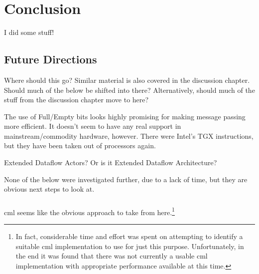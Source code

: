 \chapter{Conclusion}

I did some stuff!

\section{Future Directions}

\begin{anfxwarning}{Where should this go?}
    Similar material is also covered in the discussion chapter.  Should much of the below be shifted into there?  Alternatively, should much of the stuff from the discussion chapter move to here?
\end{anfxwarning}

The use of Full/Empty bits looks highly promising for making message passing more efficient.  It doesn't seem to have any real support in mainstream/commodity hardware, however.  There were Intel's TGX instructions, but they have been taken out of processors again.

Extended Dataflow Actors?  Or is it Extended Dataflow Architecture?






None of the below were investigated further, due to a lack of time, but they are obvious next steps to look at.

\subsection{}
\Gls{cml} seems like the obvious approach to take from here.\footnote{In fact, considerable time and effort was spent on attempting to identify a suitable \gls{cml} implementation to use for just this purpose.  Unfortunately, in the end it was found that there was not currently a usable \gls{cml} implementation with appropriate performance available at this time.}

